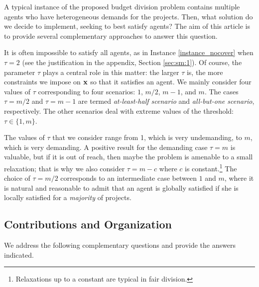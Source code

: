 \documentclass{article}
\begin{document}
A typical instance of the proposed budget division problem contains multiple agents who have heterogeneous demands for the projects. Then, what solution do we decide to implement, seeking to best satisfy agents? The aim of this article is to provide several complementary approaches to answer this question.

It is often impossible to satisfy all agents, as in  Instance \ref{instance_nocover} when  $\tau=2$ (see the justification in the appendix,  Section \ref{sec:sm:1}). Of course, the parameter $\tau$ plays a central role in this matter: the larger $\tau$ is, the more constraints we impose on ${\bf x}$ %
so that it satisfies an agent. 
 We mainly consider four  values of $\tau$ corresponding to four scenarios: $1$, $m/2$, $m-1$, and $m$. The cases  $\tau=m/2$ and $\tau=m-1$ are termed \emph{at-least-half scenario} 
and \emph{all-but-one scenario}, respectively. The other scenarios deal with extreme values of the threshold: $\tau \in \{1,m\}$. 

The values of $\tau$ that we consider 
range from 1, which is very undemanding, to $m$, which is very demanding. 
A positive result for the demanding case $\tau=m$ is valuable, but if it is out of reach, then maybe the problem is amenable to a small relaxation; that is why we also consider $\tau=m-c$ where $c$ is constant.\footnote{Relaxations up to a constant are typical in fair division.} The choice of $\tau=m/2$ corresponds to an intermediate case between $1$ and $m$, where it is natural and reasonable to admit that an agent is globally satisfied if she is locally satisfied for a \emph{majority} of projects. %



\subsection{Contributions and Organization}

We address the following complementary questions and provide the answers indicated. 
\end{document}

